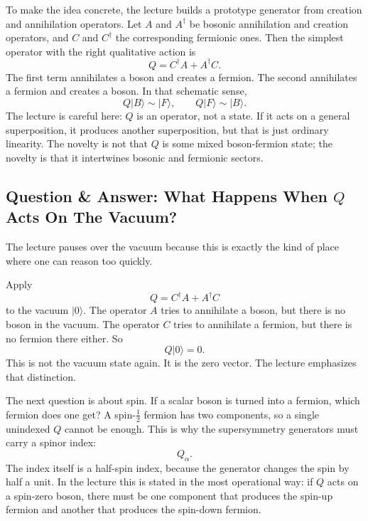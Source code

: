 To make the idea concrete, the lecture builds a prototype generator from creation and annihilation operators. Let \(A\) and \(A^\dagger\) be bosonic annihilation and creation operators, and \(C\) and \(C^\dagger\) the corresponding fermionic ones. Then the simplest operator with the right qualitative action is
\begin{equation}
Q = C^\dagger A + A^\dagger C.
\end{equation}
The first term annihilates a boson and creates a fermion. The second annihilates a fermion and creates a boson. In that schematic sense,
\begin{equation}
Q|B\rangle \sim |F\rangle,
\qquad
Q|F\rangle \sim |B\rangle.
\end{equation}
The lecture is careful here: \(Q\) is an operator, not a state. If it acts on a general superposition, it produces another superposition, but that is just ordinary linearity. The novelty is not that \(Q\) is some mixed boson-fermion state; the novelty is that it intertwines bosonic and fermionic sectors.

\subsection{Question \& Answer: What Happens When \(Q\) Acts On The Vacuum?}

The lecture pauses over the vacuum because this is exactly the kind of place where one can reason too quickly.

Apply
\begin{equation}
Q = C^\dagger A + A^\dagger C
\end{equation}
to the vacuum \(|0\rangle\). The operator \(A\) tries to annihilate a boson, but there is no boson in the vacuum. The operator \(C\) tries to annihilate a fermion, but there is no fermion there either. So
\begin{equation}
Q|0\rangle = 0.
\end{equation}
This is not the vacuum state again. It is the zero vector. The lecture emphasizes that distinction.

The next question is about spin. If a scalar boson is turned into a fermion, which fermion does one get? A spin-\(\tfrac12\) fermion has two components, so a single unindexed \(Q\) cannot be enough. This is why the supersymmetry generators must carry a spinor index:
\begin{equation}
Q_\alpha.
\end{equation}
The index itself is a half-spin index, because the generator changes the spin by half a unit. In the lecture this is stated in the most operational way: if \(Q\) acts on a spin-zero boson, there must be one component that produces the spin-up fermion and another that produces the spin-down fermion.

